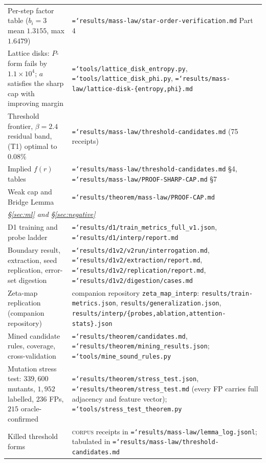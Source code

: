 \documentclass[11pt]{article}
\theoremstyle{definition}
\newcommand{\art}[1]{{\texttt{\hyphenchar\font=`\-\relax #1}}}
\begin{document}
{\begin{longtable}{p{}p{}}
Per-step factor table ($b_i=3$ mean $1.3155$, max $1.6479$) &
  \art{results/mass-law/star-order-verification.md} Part 4 \\
Lattice disks: $P$-form fails by $1.1\times10^4$; $a$ satisfies the sharp cap
  with improving margin &
  \art{tools/lattice\_disk\_entropy.py},
  \art{tools/lattice\_disk\_phi.py},
  \art{results/mass-law/lattice-disk-\{entropy,phi\}.md} \\
Threshold frontier, $\beta=2.4$ residual band, (T1) optimal to $0.08\%$ &
  \art{results/mass-law/threshold-candidates.md} (75 receipts) \\
Implied $f(r)$ tables &
  \art{results/mass-law/threshold-candidates.md} \S4,
  \art{results/mass-law/PROOF-SHARP-CAP.md} \S7 \\
Weak cap and Bridge Lemma & \art{results/theorem/mass-law/PROOF-CAP.md} \\
\midrule
\multicolumn{2}{l}{\emph{\S\ref{sec:ml} and \S\ref{sec:negative}}}\\[2pt]
D1 training and probe ladder &
  \art{results/d1/train\_metrics\_full\_v1.json},
  \art{results/d1/interp/report.md} \\
Boundary result, extraction, seed replication, error-set digestion &
  \art{results/d1v2/v2run/interrogation.md},
  \art{results/d1v2/extraction/report.md},
  \art{results/d1v2/replication/report.md},
  \art{results/d1v2/digestion/cases.md} \\
Zeta-map replication (companion repository) &
  companion repository \texttt{zeta\_map\_interp}: \texttt{results/train-metrics.json},
  \texttt{results/generalization.json},
  \texttt{results/interp/\{probes,ablation,attention-stats\}.json} \\
Mined candidate rules, coverage, cross-validation &
  \art{results/theorem/candidates.md},
  \art{results/theorem/mining\_results.json};
  \art{tools/mine\_sound\_rules.py} \\
Mutation stress test: $339{,}600$ mutants, $1{,}952$ labelled, $236$ FPs,
  $215$ oracle-confirmed &
  \art{results/theorem/stress\_test.json},
  \art{results/theorem/stress\_test.md} (every FP carries full adjacency and
  feature vector); \art{tools/stress\_test\_theorem.py} \\
Killed threshold forms & \textsc{corpus} receipts in
  \art{results/mass-law/lemma\_log.jsonl}; tabulated in
  \art{results/mass-law/threshold-candidates.md} \\
\bottomrule
\end{longtable}
}
\end{document}
